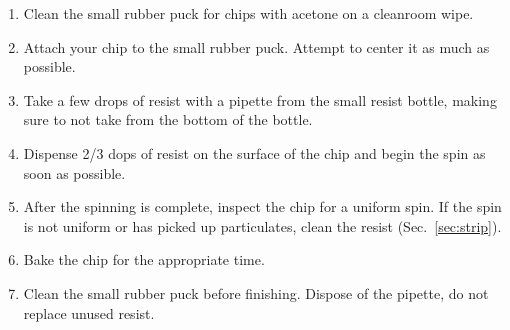 
\begin{enumerate}
    \item Clean the small rubber puck for chips with acetone on a cleanroom wipe.
    \item Attach your chip to the small rubber puck. Attempt to center it as much as possible.
    \item Take a few drops of resist with a pipette from the small resist bottle, making sure to not take from the bottom of the bottle.
    \item Dispense 2/3 dops of resist on the surface of the chip and begin the spin as soon as possible.
    \item After the spinning is complete, inspect the chip for a uniform spin. If the spin is not uniform or has picked up particulates, clean the resist (Sec.~\ref{sec:strip}).
    \item Bake the chip for the appropriate time.
    \item Clean the small rubber puck before finishing. Dispose of the pipette, do not replace unused resist.
\end{enumerate}

